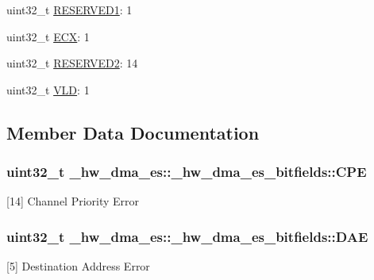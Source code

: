 \begin{DoxyCompactItemize}
\item 
uint32\+\_\+t \hyperlink{struct__hw__dma__es_1_1__hw__dma__es__bitfields_acbbe22e42c3ec49630ad87844bfa3388}{R\+E\+S\+E\+R\+V\+E\+D1}\+: 1
\item 
uint32\+\_\+t \hyperlink{struct__hw__dma__es_1_1__hw__dma__es__bitfields_af21c4764f911d86ca181504a093d7031}{E\+CX}\+: 1
\item 
uint32\+\_\+t \hyperlink{struct__hw__dma__es_1_1__hw__dma__es__bitfields_a69caa28e98c7a33ff311551a1e2cff60}{R\+E\+S\+E\+R\+V\+E\+D2}\+: 14
\item 
uint32\+\_\+t \hyperlink{struct__hw__dma__es_1_1__hw__dma__es__bitfields_a1c16f467e64bc9ce03c1f973fbfba89c}{V\+LD}\+: 1
\end{DoxyCompactItemize}


\subsection{Member Data Documentation}
\subsubsection[{\texorpdfstring{C\+PE}{CPE}}]{\setlength{\rightskip}{0pt plus 5cm}uint32\+\_\+t \+\_\+hw\+\_\+dma\+\_\+es\+::\+\_\+hw\+\_\+dma\+\_\+es\+\_\+bitfields\+::\+C\+PE}\hypertarget{struct__hw__dma__es_1_1__hw__dma__es__bitfields_aafe7fea4c7d50f8d6e7c3d1bb97b4066}{}\label{struct__hw__dma__es_1_1__hw__dma__es__bitfields_aafe7fea4c7d50f8d6e7c3d1bb97b4066}
\mbox{[}14\mbox{]} Channel Priority Error 
\subsubsection[{\texorpdfstring{D\+AE}{DAE}}]{\setlength{\rightskip}{0pt plus 5cm}uint32\+\_\+t \+\_\+hw\+\_\+dma\+\_\+es\+::\+\_\+hw\+\_\+dma\+\_\+es\+\_\+bitfields\+::\+D\+AE}\hypertarget{struct__hw__dma__es_1_1__hw__dma__es__bitfields_af91d048ad82faad880ad54e6c924441a}{}\label{struct__hw__dma__es_1_1__hw__dma__es__bitfields_af91d048ad82faad880ad54e6c924441a}
\mbox{[}5\mbox{]} Destination Address Error 
